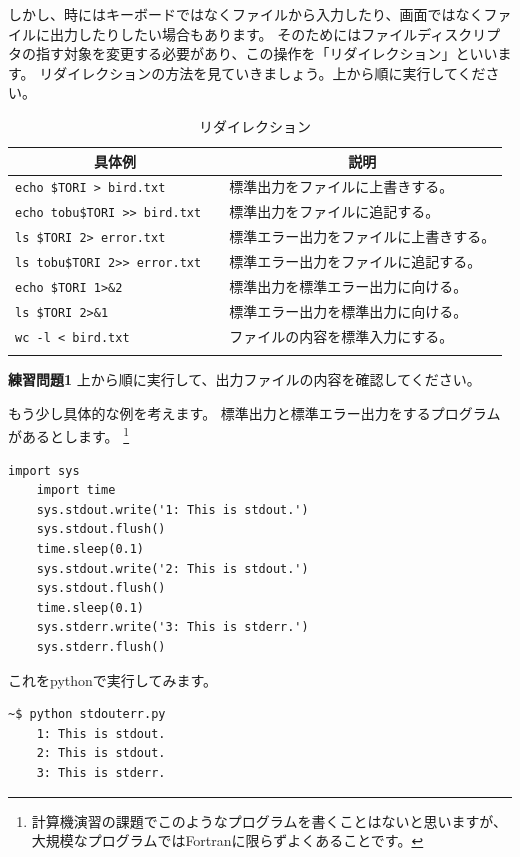 \documentclass[a4j]{ltjsreport}
\begin{document}
    しかし、時にはキーボードではなくファイルから入力したり、画面ではなくファイルに出力したりしたい場合もあります。
    そのためにはファイルディスクリプタの指す対象を変更する必要があり、この操作を「リダイレクション」といいます。
    リダイレクションの方法を見ていきましょう。上から順に実行してください。

    \begin{longtable}[c]{|l|l|}
        \hline
        \multicolumn{1}{|c|}{\textbf{具体例}}&\multicolumn{1}{|c|}{\textbf{説明}}\\
        \hline\hline
        \texttt{echo \$TORI > bird.txt} &標準出力をファイルに上書きする。\\
        \hline
        \texttt{echo tobu\$TORI >> bird.txt}　&標準出力をファイルに追記する。\\
        \hline
        \texttt{ls \$TORI 2> error.txt} &標準エラー出力をファイルに上書きする。\\
        \hline
        \texttt{ls tobu\$TORI 2>> error.txt} &標準エラー出力をファイルに追記する。\\
        \hline
        \texttt{echo \$TORI 1>\&2} &標準出力を標準エラー出力に向ける。\\
        \hline
        \texttt{ls \$TORI 2>\&1} &標準エラー出力を標準出力に向ける。\\
        \hline
        \texttt{wc -l < bird.txt} &ファイルの内容を標準入力にする。\\
        \hline
        \caption{リダイレクション}
    \end{longtable}
    \begin{itembox}[l]{\textbf{練習問題1}}
        上から順に実行して、出力ファイルの内容を確認してください。
    \end{itembox}

    もう少し具体的な例を考えます。
    標準出力と標準エラー出力をするプログラムがあるとします。
    \footnote{計算機演習の課題でこのようなプログラムを書くことはないと思いますが、
    大規模なプログラムではFortranに限らずよくあることです。}
    \begin{lstlisting}[caption=stdouterr.py]
    import sys
    import time
    sys.stdout.write('1: This is stdout.')
    sys.stdout.flush()
    time.sleep(0.1)
    sys.stdout.write('2: This is stdout.')
    sys.stdout.flush()
    time.sleep(0.1)
    sys.stderr.write('3: This is stderr.')
    sys.stderr.flush()
    \end{lstlisting}

    これをpythonで実行してみます。
    \begin{lstlisting}[numbers=none]
    ~$ python stdouterr.py
    1: This is stdout.
    2: This is stdout.
    3: This is stderr.
    \end{lstlisting}
\end{document}
